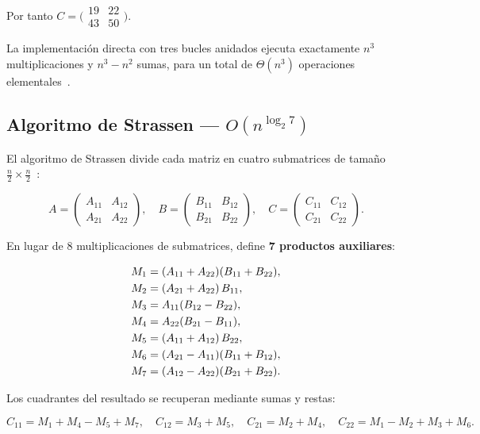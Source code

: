 \documentclass[12pt,a4paper]{article}
\begin{document}
Por tanto $C = \bigl(\begin{smallmatrix}19 & 22 \\ 43 & 50\end{smallmatrix}\bigr)$.

La implementaci\'on directa con tres bucles anidados ejecuta exactamente $n^3$
multiplicaciones y $n^3 - n^2$ sumas, para un total de $\Theta(n^3)$
operaciones elementales~\cite{cormen2009introduction}.

\subsection{Algoritmo de Strassen --- $O(n^{\log_2 7})$}

El algoritmo de Strassen divide cada matriz en cuatro submatrices de tama\~no
$\tfrac{n}{2} \times \tfrac{n}{2}$~\cite{strassen1969gaussian}:

\[
A = \begin{pmatrix} A_{11} & A_{12} \\ A_{21} & A_{22} \end{pmatrix}, \quad
B = \begin{pmatrix} B_{11} & B_{12} \\ B_{21} & B_{22} \end{pmatrix}, \quad
C = \begin{pmatrix} C_{11} & C_{12} \\ C_{21} & C_{22} \end{pmatrix}.
\]

En lugar de 8 multiplicaciones de submatrices, define \textbf{7 productos auxiliares}:

\begin{align}
    M_1 &= (A_{11} + A_{22})(B_{11} + B_{22}), \notag\\
    M_2 &= (A_{21} + A_{22})\,B_{11}, \notag\\
    M_3 &= A_{11}(B_{12} - B_{22}), \notag\\
    M_4 &= A_{22}(B_{21} - B_{11}), \notag\\
    M_5 &= (A_{11} + A_{12})\,B_{22}, \notag\\
    M_6 &= (A_{21} - A_{11})(B_{11} + B_{12}), \notag\\
    M_7 &= (A_{12} - A_{22})(B_{21} + B_{22}). \notag
\end{align}

Los cuadrantes del resultado se recuperan mediante sumas y restas:

\[
C_{11} = M_1 + M_4 - M_5 + M_7, \quad
C_{12} = M_3 + M_5, \quad
C_{21} = M_2 + M_4, \quad
C_{22} = M_1 - M_2 + M_3 + M_6.
\]
\end{document}
